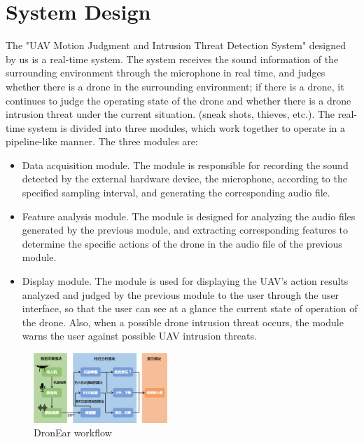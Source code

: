 \documentclass{sig-alternate-10pt}
\begin{document}
\section{System Design}
The "UAV Motion Judgment and Intrusion Threat Detection System" designed by us is a real-time system. The system receives the sound information of the surrounding environment through the microphone in real time, and judges whether there is a drone in the surrounding environment; if there is a drone, it continues to judge the operating state of the drone and whether there is a drone intrusion threat under the current situation. (sneak shots, thieves, etc.). The real-time system is divided into three modules, which work together to operate in a pipeline-like manner. The three modules are:
\begin{itemize}
    \item Data acquisition module. The module is responsible for recording the sound detected by the external hardware device, the microphone, according to the specified sampling interval, and generating the corresponding audio file.
    \item Feature analysis module. The module is designed for analyzing the audio files generated by the previous module, and extracting corresponding features to determine the specific actions of the drone in the audio file of the previous module.
    \item Display module. The module is used for displaying the UAV’s action results analyzed and judged by the previous module to the user through the user interface, so that the user can see at a glance the current state of operation of the drone. Also, when a possible drone intrusion threat occurs, the module warns the user against possible UAV intrusion threats.
\end{itemize}
\begin{figure}[!h]
	\centering
	\includegraphics[width=0.45\textwidth]{pics/workflow.png}
	\caption{DronEar workflow}
	
	\label{workflow}
\end{figure}
\end{document}
